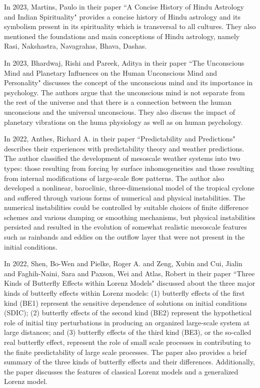 In 2023, Martins, Paulo in their paper ``A Concise History of Hindu Astrology and Indian Spirituality" provides a concise history of Hindu astrology and its symbolism present in its spirituality which is transversal to all cultures. They also mentioned the foundations and main conceptions of Hindu astrology, namely Rasi, Nakshastra, Navagrahas, Bhava, Dashas\cite{article2}.
\vspace{1\baselineskip}

In 2023, Bhardwaj, Rishi and Pareek, Aditya in their paper ``The Unconscious Mind and Planetary Influences on the Human Unconscious Mind and Personality" discusses the concept of the unconscious mind and its importance in psychology. The authors argue that the unconscious mind is not separate from the rest of the universe and that there is a connection between the human unconscious and the universal unconscious. They also discuss the impact of planetary vibrations on the huma physiology as well as on human psychology\cite{article1}.
\vspace{1\baselineskip}

In 2022, Anthes, Richard A. in their paper ``Predictability and Predictions" describes their experiences with predictability theory and weather predictions. The author classified the development of mesoscale weather systems into two types: those resulting from forcing by surface inhomogeneities and those resulting from internal modifications of large-scale flow patterns. The author also developed a nonlinear, baroclinic, three-dimensional model of the tropical cyclone and suffered through various forms of numerical and physical instabilities. The numerical instabilities could be controlled by suitable choices of finite difference schemes and various damping or smoothing mechanisms, but physical instabilities persisted and resulted in the evolution of somewhat realistic mesoscale features such as rainbands and eddies on the outflow layer that were not present in the initial conditions\cite{atmos13081292}.
\vspace{1\baselineskip}

In 2022, Shen, Bo-Wen and Pielke, Roger A. and Zeng, Xubin and Cui, Jialin and Faghih-Naini, Sara and Paxson, Wei and Atlas, Robert in their paper ``Three Kinds of Butterfly Effects within Lorenz Models" discussed about the three major kinds of butterfly effects within Lorenz models: (1) butterfly effects of the first kind (BE1) represent the sensitive dependence of solutions on initial conditions (SDIC); (2) butterfly effects of the second kind (BE2) represent the hypothetical role of initial tiny perturbations in producing an organized large-scale system at large distances; and (3) butterfly effects of the third kind (BE3), or the so-called real butterfly effect, represent the role of small scale processes in contributing to the finite predictability of large scale processes. The paper also provides a brief summary of the three kinds of butterfly effects and their differences. Additionally, the paper discusses the features of classical Lorenz models and a generalized Lorenz model\cite{encyclopedia2030084}.
\vspace{1\baselineskip}

